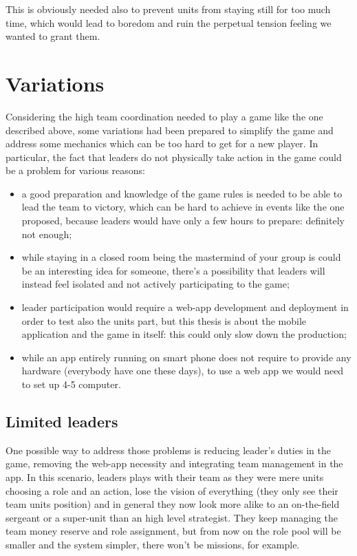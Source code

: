 			This is obviously needed also to prevent units from staying still for too much time, which would lead to boredom and ruin the perpetual tension feeling we wanted to grant them.
			
	\section{Variations}
		
		Considering the high team coordination needed to play a game like the one described above, some variations had been prepared to simplify the game and address some mechanics which can be too hard to get for a new player.
		In particular, the fact that leaders do not physically take action in the game could be a problem for various reasons:
		
		\begin{itemize}
			\item a good preparation and knowledge of the game rules is needed to be able to lead the team to victory, which can be hard to achieve in events like the one proposed, because leaders would have only a few hours to prepare: definitely not enough;
			\item while staying in a closed room being the mastermind of your group is could be an interesting idea for someone, there's a possibility that leaders will instead feel isolated and not actively participating to the game;
			\item leader participation would require a web-app development and deployment in order to test also the units part, but this thesis is about the mobile application and the game in itself: this could only slow down the production;
			\item while an app entirely running on smart phone does not require to provide any hardware (everybody have one these days), to use a web app we would need to set up 4-5 computer.
		\end{itemize}
		
		\subsection{Limited leaders}
		
			One possible way to address those problems is reducing leader's duties in the game, removing the web-app necessity and integrating team management in the app.
			In this scenario, leaders plays with their team as they were mere units choosing a role and an action, lose the vision of everything (they only see their team units position) and in general they now look more alike to an on-the-field sergeant or a super-unit than an high level strategist.
			They keep managing the team money reserve and role assignment, but from now on the role pool will be smaller and the system simpler, there won't be missions, for example.
			
